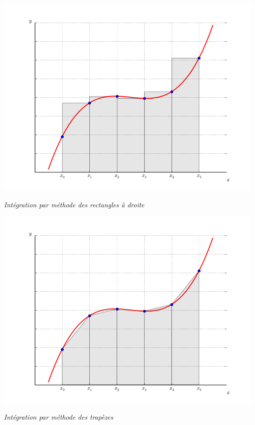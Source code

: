 \documentclass[10pt]{article}
\begin{document}
\begin{minipage}[c]{.24\linewidth}
\begin{center}
\includegraphics[width=\textwidth]{images/CourbesPython/rect_d}

\textit{Intégration par méthode des rectangles à droite}
\end{center}
\end{minipage} \hfill
\begin{minipage}[c]{.24\linewidth}
\begin{center}
\includegraphics[width=\textwidth]{images/CourbesPython/trap}

\textit{Intégration par méthode des trapèzes}
\end{center}
\end{minipage}
\end{document}
